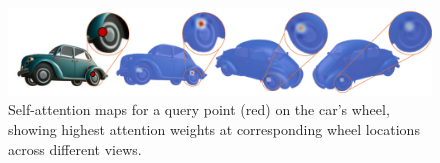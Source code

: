 \begin{figure}
    \centering
    \includegraphics[width=0.99\linewidth]{images/cross-view-attention.pdf}
    \vspace{-10pt}
    \caption{Self-attention maps for a query point (red) on the car's wheel, showing highest attention weights at corresponding wheel locations across different views.}
    \vspace{-14pt}
    \label{fig:cross-view-attention}
\end{figure}